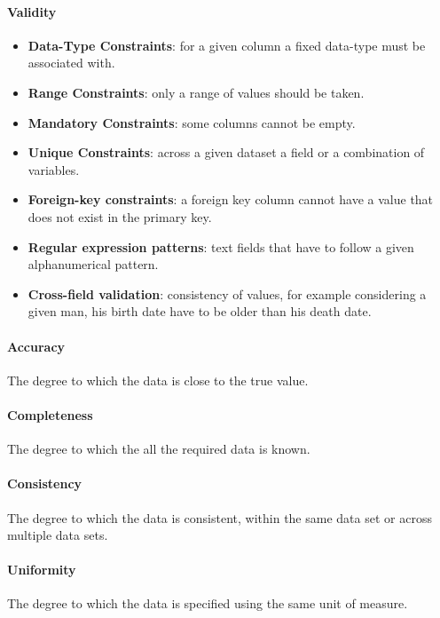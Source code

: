 \paragraph{Validity}
\begin{itemize}
    \item \textbf{Data-Type Constraints}: for a given column a fixed data-type must be associated with.
    \item \textbf{Range Constraints}: only a range of values should be taken.
    \item \textbf{Mandatory Constraints}: some columns cannot be empty.
    \item \textbf{Unique Constraints}: across a given dataset a field or a combination of variables.
    \item \textbf{Foreign-key constraints}: a foreign key column cannot have a value that
        does not exist in the primary key.
    \item \textbf{Regular expression patterns}: text fields that have to follow a given 
        alphanumerical pattern.
    \item \textbf{Cross-field validation}: consistency of values, for example considering
        a given man, his birth date have to be older than his death date.
\end{itemize}

\paragraph{Accuracy}
The degree to which the data is close to the true value.

\paragraph{Completeness}
The degree to which the all the required data is known.

\paragraph{Consistency}
The degree to which the data is consistent, within the same data set or across multiple 
data sets.

\paragraph{Uniformity}
The degree to which the data is specified using the same unit of measure.
